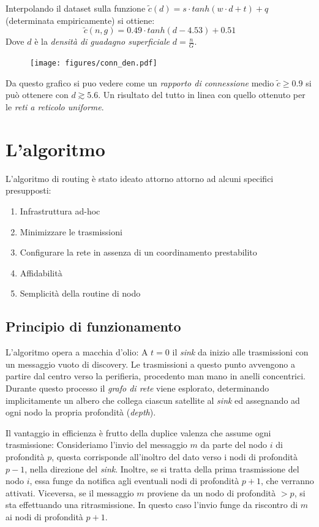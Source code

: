 \documentclass[a4paper,12pt]{article}
\theoremstyle{definition}
\begin{document}
Interpolando il dataset sulla funzione $\tilde{c}(d) = s \cdot tanh(w \cdot d + t) + q$ (determinata empiricamente) si ottiene:
\begin{equation*}
\tilde{c}(n, g) = 0.49 \cdot tanh(d - 4.53) + 0.51
\end{equation*}
Dove $d$ è la \emph{densità di guadagno superficiale} $d = \frac{n}{G}$.

\begin{figure}[H]
\centering
\texttt{[image: figures/conn\_den.pdf]}
\caption{}
\end{figure}

Da questo grafico si puo vedere come un \emph{rapporto di connessione} medio $\tilde{c} \geq 0.9$ si può ottenere con $d \gtrsim 5.6$. Un risultato del tutto in linea con quello ottenuto per le \emph{reti a reticolo uniforme}.

\section{L'algoritmo}

L'algoritmo di routing è stato ideato attorno attorno ad alcuni specifici presupposti:

\begin{enumerate}
\item Infrastruttura ad-hoc
\item Minimizzare le trasmissioni
\item Configurare la rete in assenza di un coordinamento prestabilito
\item Affidabilità
\item Semplicità della routine di nodo
\end{enumerate}

\subsection{Principio di funzionamento}

L'algoritmo opera a macchia d'olio: A $t=0$ il \emph{sink} da inizio alle trasmissioni con un messaggio vuoto di discovery. Le trasmissioni a questo punto avvengono a partire dal centro verso la perifieria, procedento man mano in anelli concentrici. Durante questo processo il \emph{grafo di rete} viene esplorato, determinando implicitamente un albero che collega ciascun satellite al \emph{sink} ed assegnando ad ogni nodo la propria profondità (\emph{depth}).

Il vantaggio in efficienza è frutto della duplice valenza che assume ogni trasmissione: Consideriamo l'invio del messaggio $m$ da parte del nodo $i$ di profondità $p$, questa corrisponde all'inoltro del dato verso i nodi di profondità $p-1$, nella direzione del \emph{sink}. Inoltre, se si tratta della prima trasmissione del nodo $i$, essa funge da notifica agli eventuali nodi di profondità $p+1$, che verranno attivati. Viceversa, se il messaggio $m$ proviene da un nodo di profondità $> p$, si sta effettuando una ritrasmissione. In questo caso l'invio funge da riscontro di $m$ ai nodi di profondità $p+1$.
\end{document}
